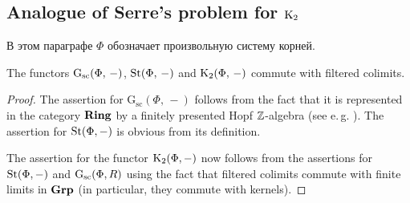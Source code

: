 \documentclass[oneside, 11pt]{amsart} \pdfoutput=1
\begin{document}
\subsection{Analogue of Serre's problem for \texorpdfstring{${\mathrm{K}}_2$}{K2}}

В этом параграфе $\Phi$ обозначает произвольную систему корней.

\begin{lemma}
\label{k2cdc} 
The functors $\mathrm{G}_\mathrm{sc}(\Phi,\,-)$, $\mathop{\mathrm{St}}\nolimits(\Phi,\,-)$ and ${\mathrm{K}}_2(\Phi,\,-)$ commute with filtered colimits.
\end{lemma}
\begin{proof}
The assertion for $\mathrm G_{\mathrm{sc}}(\Phi,\,-)$ follows from the fact that it is represented in the category ${\normalfont\textbf{Ring}}$ by a finitely presented Hopf $\mathbb{Z}$-algebra (see e.\,g. \cite[Lemma~10.127.3]{stacks-project}). The assertion for $\mathop{\mathrm{St}}\nolimits(\Phi, -)$ is obvious from its definition. 

The assertion for the functor ${\mathrm{K}}_2(\Phi, -)$ now follows from the assertions for $\mathop{\mathrm{St}}\nolimits(\Phi, -)$ and $\mathrm{G}_\mathrm{sc}(\Phi, R)$ using the fact that filtered colimits commute with finite limits in ${\normalfont\textbf{Grp}}$ (in particular, they commute with kernels).
\end{proof}

\begin{comment}
Пусть $R=\mathrm{colim}_I R_i$~--- направленный копредел колец. Покажем, что 
$$ \St(\Phi,\,R)=\mathrm{colim}_I\St(\Phi,\,R_i). $$ Для этого можно проверить универсальное свойство копредела. Если $f_i\colon\St(\Phi,\,R_i)\rightarrow G$, и $x_\alpha(r)\in\St(\Phi,\,R)$, можно найти $r'\in R_i$ для некоторого $i$ такой, что $r'$ переходит в $r$, и определить $f(x_\alpha(r))=f_i(x_\alpha(r'))$. Легко видеть, что такое определение не зависит от выбора $i$, и сохраняет соотношения Стейнберга. Тогда $f$ будет искомым отображением из $\St(\Phi,\,R)$ в $G$, замыкающим диаграмму до коммутативной. Единственность такого $g$ также легко проверить на образующих. \end{comment}

\begin{comment}
Теперь утверждение про $\K_2$ следует из того, что направленный копредел является точным функтором в категории групп, но поскольку я не знаю, где это написано, то привожу доказательство. Рассмотрим естественное отображение $$ f\colon\mathrm{colim}_I\K_2(\Phi,\,R_i)\rightarrow\K_2(\Phi,\,R), $$ и докажем, что оно является биекцией. Если $x\in\K_2(\Phi,\,R)$, то найдётся $y\in\St(\Phi,\,R_i)$ для некоторого $i$ по предыдущему пункту, который переходит в $x$. Пусть $\phi$ обозначает естественное отображение $$ \phi\colon\St(\Phi,\,-)\rightarrow\mathrm G_{\mathrm{sc}}(\Phi,\,-). $$ Поскольку $\phi(y)$ в пределе переходит в $1$, можно считать, что $\phi(y)=1$, то есть $y\in\K_2(\Phi,\,R_i)$. Это доказывает сюръективность $f$. Пусть теперь $x\in\mathrm{colim}_I\K_2(\Phi,\,R_i)$ переходит в $1$ под действием $f$. Тогда образ $x$ в $x\in\mathrm{colim}_I\St(\Phi,\,R_i)$ также равен $1$, и используя конструкцию прямого предела в категории групп $$ \left(\bigsqcup_i\K_2(\Phi,\,R_i)/\sim\right)\rightarrow\left(\bigsqcup_i\St(\Phi,\,R_i)/\sim\right), $$ мы заключаем, что $x$ равен $1$.
\end{comment}
\end{document}
